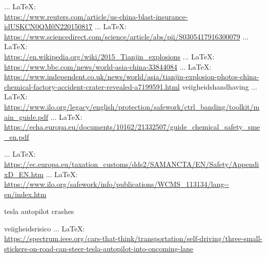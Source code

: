 \begin{thebibliography}{99}
     ... \LaTeX:\\ \url{https://www.reuters.com/article/us-china-blast-insurance-idUSKCN0QM0N220150817}
     ... \LaTeX:\\ \url{https://www.sciencedirect.com/science/article/abs/pii/S0305417916300079}
     ... \LaTeX:\\ \url{https://en.wikipedia.org/wiki/2015_Tianjin_explosions}
     ... \LaTeX:\\ \url{https://www.bbc.com/news/world-asia-china-33844084}
     ... \LaTeX:\\ \url{https://www.independent.co.uk/news/world/asia/tianjin-explosion-photos-china-chemical-factory-accident-crater-revealed-a7199591.html}
    veiigheidshandhaving
     ... \LaTeX:\\ \url{https://www.ilo.org/legacy/english/protection/safework/ctrl_banding/toolkit/main_guide.pdf}
     ... \LaTeX:\\ \url{https://echa.europa.eu/documents/10162/21332507/guide_chemical_safety_sme_en.pdf}

     ... \LaTeX:\\ \url{https://ec.europa.eu/taxation_customs/dds2/SAMANCTA/EN/Safety/AppendixD_EN.htm}
     ... \LaTeX:\\ \url{https://www.ilo.org/safework/info/publications/WCMS_113134/lang--en/index.htm}


tesla autopilot crashes


veiigheidsrisico
 ... \LaTeX:\\ \url{https://spectrum.ieee.org/cars-that-think/transportation/self-driving/three-small-stickers-on-road-can-steer-tesla-autopilot-into-oncoming-lane}


\end{thebibliography}
